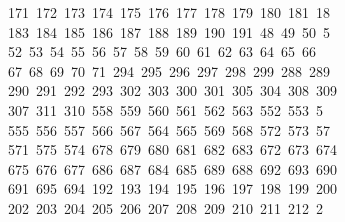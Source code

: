 \begin{tabbing}
\ 171\ 172\ 173\ 174\ 175\ 176\ 177\ 178\ 179\ 180\ 181\ 18\\[0pt]
\ 183\ 184\ 185\ 186\ 187\ 188\ 189\ 190\ 191\ 48\ 49\ 50\ 5\\[0pt]
\ 52\ 53\ 54\ 55\ 56\ 57\ 58\ 59\ 60\ 61\ 62\ 63\ 64\ 65\ 66\\[0pt]
\>\ 67\ 68\ 69\ 70\ 71\ 294\ 295\ 296\ 297\ 298\ 299\ 288\ 289\\[0pt]
\>\ 290\ 291\ 292\ 293\ 302\ 303\ 300\ 301\ 305\ 304\ 308\ 309\ \\[0pt]
\ 307\ 311\ 310\ 558\ 559\ 560\ 561\ 562\ 563\ 552\ 553\ 5\\[0pt]
\ 555\ 556\ 557\ 566\ 567\ 564\ 565\ 569\ 568\ 572\ 573\ 57\\[0pt]
\ 571\ 575\ 574\ 678\ 679\ 680\ 681\ 682\ 683\ 672\ 673\ 674\\[0pt]
\>\ 675\ 676\ 677\ 686\ 687\ 684\ 685\ 689\ 688\ 692\ 693\ 690\\[0pt]
\>\ 691\ 695\ 694\ 192\ 193\ 194\ 195\ 196\ 197\ 198\ 199\ 200\ \\[0pt]
\ 202\ 203\ 204\ 205\ 206\ 207\ 208\ 209\ 210\ 211\ 212\ 2\\[0pt]

\end{tabbing}
